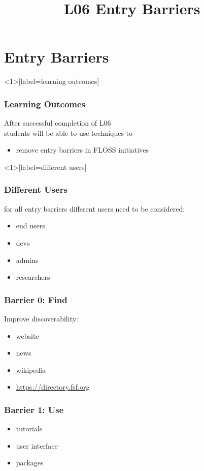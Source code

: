 

\title{L06 Entry Barriers}



\section{Entry Barriers}

\begin{frame}<1>[label=learning outcomes]
	\frametitle{Learning Outcomes}
	After successful completion of L06 \\
	students will be able to
	use techniques to

	\begin{itemize}
	\item remove entry barriers in FLOSS initiatives
	\end{itemize}
\end{frame}

\begin{frame}<1>[label=different users]
	\frametitle{Different Users}

	for all entry barriers different users need to be considered:

	\begin{itemize}[<+-| alert@+>]
	\item end users
	\item devs
	\item admins
	\item researchers
	\end{itemize}
\end{frame}

\begin{frame}
	\frametitle{Barrier 0: Find}

	Improve discoverability:

	\begin{itemize}[<+-| alert@+>]
	\item website
	\item news
	\item wikipedia
	\item \url{https://directory.fsf.org}
	\end{itemize}
\end{frame}

\begin{frame}
	\frametitle{Barrier 1: Use}

	\begin{itemize}[<+-| alert@+>]
	\item tutorials
	\item user interface
	\item packages
	\end{itemize}
\end{frame}


